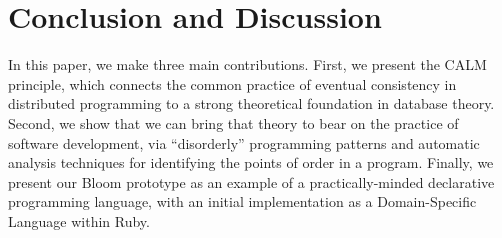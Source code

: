 \section{Conclusion and Discussion}
\label{sec:conclusion}
In this paper, we make three main contributions.  First, we present the CALM
principle, which connects the common practice of eventual consistency in
distributed programming to a strong theoretical foundation in database theory.
Second, we show that we can bring that theory to bear on the practice of
software development, via ``disorderly'' programming patterns and automatic
analysis techniques for identifying the points of order in a program. Finally,
we present our Bloom prototype as an example of a practically-minded declarative
programming language, with an initial implementation as a Domain-Specific
Language within Ruby.
